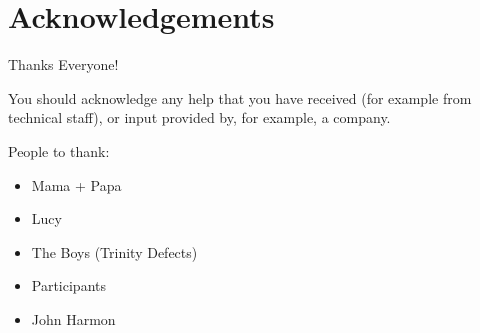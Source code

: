 \newpage
\onehalfspacing\raggedright %

\section*{\Huge{Acknowledgements}}
Thanks Everyone!

You should acknowledge any help that you have received (for example from technical staff), or input provided by, for example, a company.

People to thank:
\begin{itemize}
  \item Mama + Papa
  \item Lucy
  \item The Boys (Trinity Defects)
  \item Participants
  \item John Harmon
\end{itemize}
